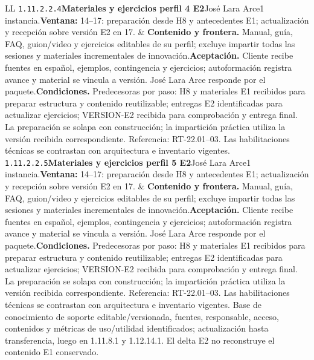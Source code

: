 \begin{longtable}{L{\tabcolsep\relax}L{\tabcolsep\relax}}
\texttt{1.\allowbreak{}11.\allowbreak{}2.\allowbreak{}2.\allowbreak{}4}\newline{}\textbf{Materiales y ejercicios perfil 4 E2}\newline{}José Lara Arce\newline{}1 instancia.\newline{}\textbf{Ventana:} 14--17: preparación desde H8 y antecedentes E1; actualización y recepción sobre versión E2 en 17. & \textbf{Contenido y frontera.} Manual, guía, FAQ, guion/video y ejercicios editables de su perfil; excluye impartir todas las sesiones y materiales incrementales de innovación.\newline{}\textbf{Aceptación.} Cliente recibe fuentes en español, ejemplos, contingencia y ejercicios; autoformación registra avance y material se vincula a versión. José Lara Arce responde por el paquete.\newline{}\textbf{Condiciones.} Predecesoras por paso: H8 y materiales E1 recibidos para preparar estructura y contenido reutilizable; entregas E2 identificadas para actualizar ejercicios; VERSION-E2 recibida para comprobación y entrega final. La preparación se solapa con construcción; la impartición práctica utiliza la versión recibida correspondiente. Referencia: RT-22.01--03. Las habilitaciones técnicas se contrastan con arquitectura e inventario vigentes.\\\hline
\texttt{1.\allowbreak{}11.\allowbreak{}2.\allowbreak{}2.\allowbreak{}5}\newline{}\textbf{Materiales y ejercicios perfil 5 E2}\newline{}José Lara Arce\newline{}1 instancia.\newline{}\textbf{Ventana:} 14--17: preparación desde H8 y antecedentes E1; actualización y recepción sobre versión E2 en 17. & \textbf{Contenido y frontera.} Manual, guía, FAQ, guion/video y ejercicios editables de su perfil; excluye impartir todas las sesiones y materiales incrementales de innovación.\newline{}\textbf{Aceptación.} Cliente recibe fuentes en español, ejemplos, contingencia y ejercicios; autoformación registra avance y material se vincula a versión. José Lara Arce responde por el paquete.\newline{}\textbf{Condiciones.} Predecesoras por paso: H8 y materiales E1 recibidos para preparar estructura y contenido reutilizable; entregas E2 identificadas para actualizar ejercicios; VERSION-E2 recibida para comprobación y entrega final. La preparación se solapa con construcción; la impartición práctica utiliza la versión recibida correspondiente. Referencia: RT-22.01--03. Las habilitaciones técnicas se contrastan con arquitectura e inventario vigentes. Base de conocimiento de soporte editable/versionada, fuentes, responsable, acceso, contenidos y métricas de uso/utilidad identificados; actualización hasta transferencia, luego en 1.11.8.1 y 1.12.14.1. El delta E2 no reconstruye el contenido E1 conservado.\\\hline

\end{longtable}
